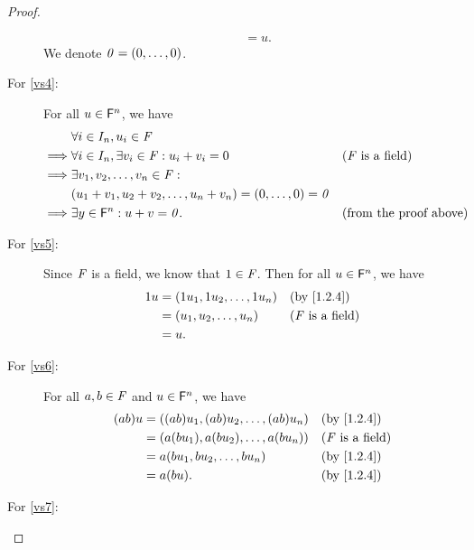 \begin{proof}
\begin{description}
\begin{align*}
                            & = u.
      \end{align*}
      We denote \(\mathit{0} = \left\lparen0, \dots, 0\right\rparen\).
    \item[For \ref{vs4}:]
      For all \(u \in \mathsf{F}^{n}\), we have
      \begin{align*}
                 & \forall i \in I_{n}, u_{i} \in \F                                                                                 \\
        \implies & \forall i \in I_{n}, \exists v_{i} \in \F : u_{i} + v_{i} = 0                  &  & \text{(\(\F\) is a field)}    \\
        \implies & \exists v_{1}, v_{2}, \dots, v_{n} \in \F :                                                                       \\
                 & \p{u_{1} + v_{1}, u_{2} + v_{2}, \dots, u_{n} + v_{n}} = \p{0, \dots, 0} = \zv                                    \\
        \implies & \exists y \in \vs{F}^{n} : u + v = \zv.                                        &  & \text{(from the proof above)}
      \end{align*}
    \item[For \ref{vs5}:]
      Since \(\mathit{F}\) is a field, we know that \(1 \in \mathit{F}\).
      Then for all \(u \in \mathsf{F}^{n}\), we have
      \begin{align*}
        1u & = \p{1 u_{1}, 1 u_{2}, \dots, 1 u_{n}} &  & \text{(by \cref{1.2.4})}   \\
           & = \tp{u}{n}                            &  & \text{(\(\F\) is a field)} \\
           & = u.
      \end{align*}
    \item[For \ref{vs6}:]
      For all \(a, b \in \mathit{F}\) and \(u \in \mathsf{F}^{n}\), we have
      \begin{align*}
        \p{ab} u & = \p{\p{ab} u_{1}, \p{ab} u_{2}, \dots, \p{ab} u_{n}}    &  & \text{(by \cref{1.2.4})}   \\
                 & = \p{a \p{b u_{1}}, a \p{b u_{2}}, \dots, a \p{b u_{n}}} &  & \text{(\(\F\) is a field)} \\
                 & = a \p{b u_{1}, b u_{2}, \dots, b u_{n}}                 &  & \text{(by \cref{1.2.4})}   \\
                 & = a \p{bu}.                                              &  & \text{(by \cref{1.2.4})}
      \end{align*}
    \item[For \ref{vs7}:]

\end{description}
\end{proof}
